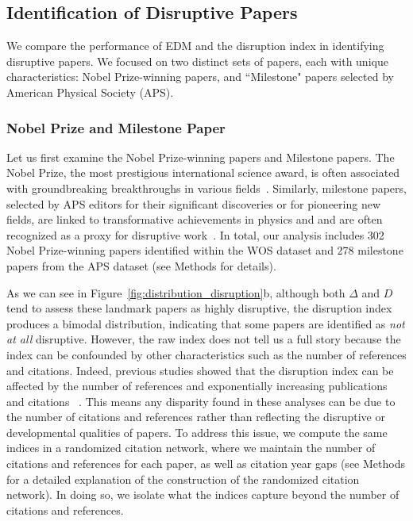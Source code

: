 \documentclass[12pt]{article}
\begin{document}
\subsection{Identification of Disruptive Papers}
\label{sec:result_identification}
We compare the performance of EDM and the disruption index in identifying disruptive papers. We focused on two distinct sets of papers, each with unique characteristics: Nobel Prize-winning papers, and ``Milestone" papers selected by American Physical Society (APS).


\subsubsection{Nobel Prize and Milestone Paper}


Let us first examine the Nobel Prize-winning papers and Milestone papers. The Nobel Prize, the most prestigious international science award, is often associated with groundbreaking breakthroughs in various fields~\cite{NSF_nobel}. Similarly, milestone papers, selected by APS editors for their significant discoveries or for pioneering new fields, are linked to transformative achievements in physics and and are often recognized as a proxy for disruptive work~\cite{bornmann2021convergent,bittmann2021applied}. In total, our analysis includes 302 Nobel Prize-winning papers identified within the WOS dataset and 278 milestone papers from the APS dataset  (see Methods for details).




As we can see in Figure~\ref{fig:distribution_disruption}b, although both $\Delta$ and $D$ tend to assess these landmark papers as highly disruptive, the disruption index produces a bimodal distribution, indicating that some papers are identified as \emph{not at all} disruptive. However, the raw index does not tell us a full story because the index can be confounded by other characteristics such as the number of references and citations. Indeed, previous studies showed that the disruption index can be affected by the number of references and exponentially increasing publications and citations ~\cite{ruan2021rethinking,petersen2023disruption,bentley2023disruption}. This means any disparity found in these analyses can be due to the number of citations and references rather than reflecting the disruptive or developmental qualities of papers. To address this issue, we compute the same indices in a randomized citation network, where we maintain the number of citations and references for each paper, as well as citation year gaps (see Methods for a detailed explanation of the construction of the randomized citation network). In doing so, we isolate what the indices capture beyond the number of citations and references. 
\end{document}
